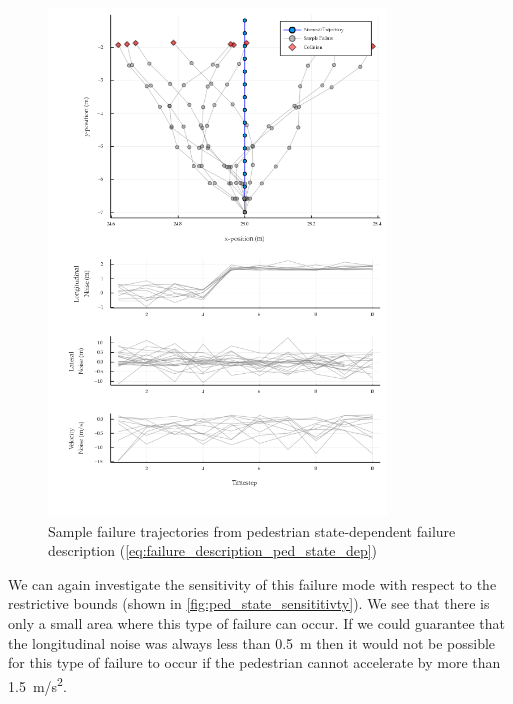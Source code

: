 \begin{figure}
    \includegraphics[width=0.8\textwidth]{figures/interpretable_validation/state_dep_failure_examples.png}
    \caption{Sample failure trajectories from pedestrian state-dependent failure description (\cref{eq:failure_description_ped_state_dep})}
    \label{fig:ped_state_dep_sample_failures}
\end{figure}

We can again investigate the sensitivity of this failure mode with respect to the restrictive bounds (shown in \cref{fig:ped_state_sensititivty}). We see that there is only a small area where this type of failure can occur. If we could guarantee that the longitudinal noise was always less than \SI{0.5}{m} then it would not be possible for this type of failure to occur if the pedestrian cannot accelerate by more than \SI{1.5}{m/s^2}. 

